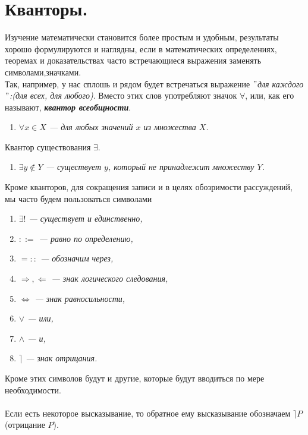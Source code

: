 \section{Кванторы.}
Изучение математически становится более простым и удобным, результаты хорошо формулируются и наглядны, если в математических определениях, теоремах и доказательствах часто встречающиеся выражения заменять символами,значками.\\
Так, например, у нас сплошь и рядом будет встречаться выражение \textit{$"$для каждого$"$:(для всех, для любого)}. Вместо этих слов употребляют значок $\forall$, или, как его называют, \textbf{\textit{квантор всеобщности}}.
\begin{enumerate}
	\item[] \textit{\textbf{$\forall x \in X$} \quad --- для любых значений $x$ из множества $X$.}
\end{enumerate}
Квантор существования $\exists$.
\begin{enumerate}
	\item[] \textit{\textbf{$\exists y \notin Y$} \quad --- существует $y$, который не принадлежит множеству $Y$.}
\end{enumerate}
Кроме кванторов, для сокращения записи и в целях обозримости рассуждений, мы часто будем пользоваться символами
\begin{enumerate}
	\item[] \textit{\textbf{$\exists!$} \quad --- существует и единственно, }
	\item[] \textit{\textbf{$::=$} \quad --- равно по определению, }
	\item[] \textit{\textbf{$=::$} \quad --- обозначим через, }
	\item[] \textit{\textbf{$\Rightarrow, \Leftarrow$} \quad --- знак логического следования,}
	\item[] \textit{\textbf{$\Leftrightarrow$} \quad --- знак равносильности, }
	\item[] \textit{\textbf{$\vee$} \quad --- или, }
	\item[] \textit{\textbf{$\wedge$} \quad --- и, }
	\item[] \textit{\textbf{$\rceil$} \quad --- знак отрицания. }
\end{enumerate}
Кроме этих символов будут и другие, которые будут вводиться по мере необходимости.\\\\
Если есть некоторое высказывание, то обратное ему высказывание обозначаем $\rceil P$ (отрицание $P$).\\\\
